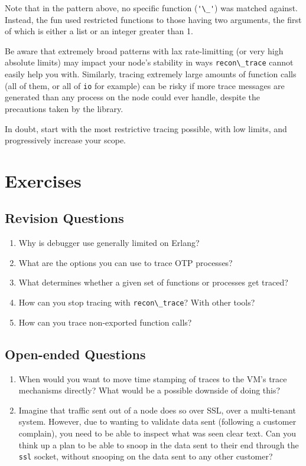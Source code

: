 \documentclass[11pt, oneside]{book}   	%
\newcommand{\module}[1]{\Verb`#1`}
\newcommand{\expression}[1]{\Verb`#1`}
\begin{document}
Note that in the pattern above, no specific function (\expression{'\_'}) was matched against. Instead, the fun used restricted functions to those having two arguments, the first of which is either a list or an integer greater than 1.

Be aware that extremely broad patterns with lax rate-limitting (or very high absolute limits) may impact your node's stability in ways \module{recon\_trace} cannot easily help you with. Similarly, tracing extremely large amounts of function calls (all of them, or all of \module{io} for example) can be risky if more trace messages are generated than any process on the node could ever handle, despite the precautions taken by the library.

In doubt, start with the most restrictive tracing possible, with low limits, and progressively increase your scope.


\section{Exercises}

\subsection{Revision Questions}

\begin{enumerate}
	\item Why is debugger use generally limited on Erlang?
	\item What are the options you can use to trace OTP processes?
	\item What determines whether a given set of functions or processes get traced?
	\item How can you stop tracing with \module{recon\_trace}? With other tools?
	\item How can you trace non-exported function calls?
\end{enumerate}

\subsection{Open-ended Questions}

\begin{enumerate}
	\item When would you want to move time stamping of traces to the VM's trace mechanisms directly? What would be a possible downside of doing this?	
	\item Imagine that traffic sent out of a node does so over SSL, over a multi-tenant system. However, due to wanting to validate data sent (following a customer complain), you need to be able to inspect what was seen clear text. Can you think up a plan to be able to snoop in the data sent to their end through the \module{ssl} socket, without snooping on the data sent to any other customer?
\end{enumerate}
\end{document}
